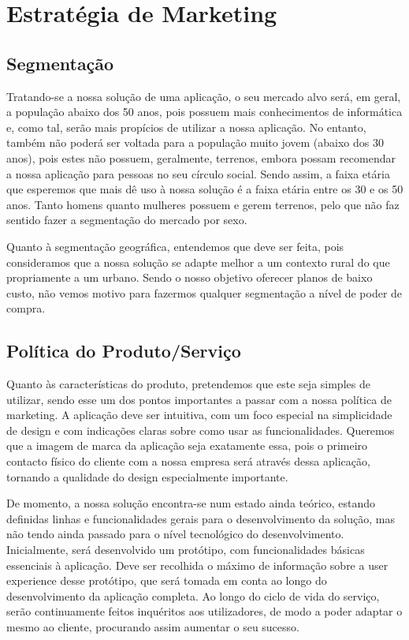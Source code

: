 \documentclass[11pt]{article}
\begin{document}
	\pagebreak
	
	\large
	\section{Estratégia de Marketing}
	\subsection{Segmentação}
	
	\normalsize
	
	Tratando-se a nossa solução de uma aplicação, o seu mercado alvo será, em geral, a população abaixo dos 50 anos, pois possuem mais conhecimentos de informática e, como tal, serão mais propícios de utilizar a nossa aplicação. No entanto, também não poderá ser voltada para a população muito jovem (abaixo dos 30 anos), pois estes não possuem, geralmente, terrenos, embora possam recomendar a nossa aplicação para pessoas no seu círculo social. Sendo assim, a faixa etária que esperemos que mais dê uso à nossa solução é a faixa etária entre os 30 e os 50 anos. Tanto homens quanto mulheres possuem e gerem terrenos, pelo que não faz sentido fazer a segmentação do mercado por sexo.
	
	Quanto à segmentação geográfica, entendemos que deve ser feita, pois consideramos que a nossa solução se adapte melhor a um contexto rural do que propriamente a um urbano. Sendo o nosso objetivo oferecer planos de baixo custo, não vemos motivo para fazermos qualquer segmentação a nível de poder de compra.
	
	\large
	\subsection{Política do Produto/Serviço}
	
	\normalsize
	
	Quanto às características do produto, pretendemos que este seja simples de utilizar, sendo esse um dos pontos importantes a passar com a nossa política de marketing. A aplicação deve ser intuitiva, com um foco especial na simplicidade de design e com indicações claras sobre como usar as funcionalidades. Queremos que a imagem de marca da aplicação seja exatamente essa, pois o primeiro contacto físico do cliente com a nossa empresa será através dessa aplicação, tornando a qualidade do design especialmente importante.
	
	De momento, a nossa solução encontra-se num estado ainda teórico, estando definidas linhas e funcionalidades gerais para o desenvolvimento da solução, mas não tendo ainda passado para o nível tecnológico do desenvolvimento. Inicialmente, será desenvolvido um protótipo, com funcionalidades básicas essenciais à aplicação. Deve ser recolhida o máximo de informação sobre a user experience desse protótipo, que será tomada em conta ao longo do desenvolvimento da aplicação completa. Ao longo do ciclo de vida do serviço, serão continuamente feitos inquéritos aos utilizadores, de modo a poder adaptar o mesmo ao cliente, procurando assim aumentar o seu sucesso.
	
\end{document}
